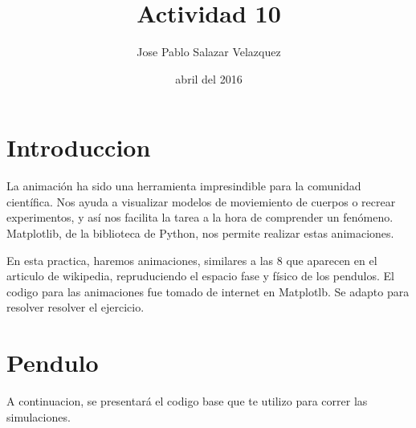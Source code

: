 \documentclass[a4paper]{article}
\title{Actividad 10}
\author{Jose Pablo Salazar Velazquez}
\date{abril del 2016}
\begin{document}
\maketitle

\section{Introduccion}

La animación ha sido una herramienta impresindible para la comunidad científica. Nos ayuda a visualizar modelos de moviemiento de cuerpos o recrear experimentos, y así nos facilita la tarea a la hora de comprender un fenómeno. Matplotlib, de la biblioteca de Python, nos permite realizar estas animaciones.

En esta practica, haremos animaciones, similares a las 8 que aparecen en el articulo de wikipedia, repruduciendo el espacio fase y físico de los pendulos. 
El codigo para las animaciones fue tomado de internet en Matplotlb. Se adapto para resolver resolver el ejercicio.

\section{Pendulo}
\label{sec:examples}

A continuacion, se presentará el codigo base que te utilizo para correr las simulaciones.
\end{document}
